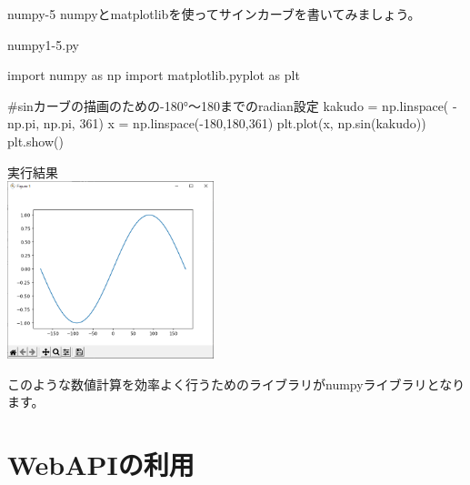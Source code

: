 \begin{pabox}{numpy-5}
numpyとmatplotlibを使ってサインカーブを書いてみましょう。

\begin{legbox}{numpy1-5.py}
\begin{listing}{1}
import numpy as np 
import matplotlib.pyplot as plt

#sinカーブの描画のための-180°～180までのradian設定
kakudo = np.linspace( -np.pi, np.pi, 361)
x = np.linspace(-180,180,361)
plt.plot(x, np.sin(kakudo))
plt.show()
\end{listing}

実行結果\\

\includegraphics[width=6cm]{images/graph6.png} 

\end{legbox}


\end{pabox}
このような数値計算を効率よく行うためのライブラリがnumpyライブラリとなります。

\section{WebAPIの利用}





